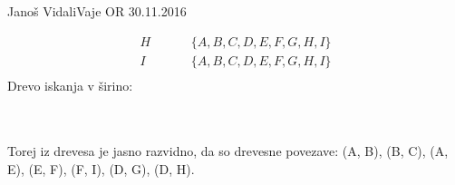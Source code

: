 \begin{naloga}{Janoš Vidali}{Vaje OR 30.11.2016}
\begin{odgovor}
$$\begin{array}{c|c|c|c|c}
H & & & &  \{A, B, C, D, E, F, G, H, I\} \\
I & & & &  \{A, B, C, D, E, F, G, H, I\} \\
\end{array}
$$
%
Drevo iskanja v širino: 
%
\begin{slika}
\end{slika}
\\
\\
%
Torej iz drevesa  je jasno razvidno, da so drevesne povezave: (A, B), (B, C), (A, E), (E, F), (F, I), (D, G), (D, H).
%

\end{odgovor}
\end{naloga}
